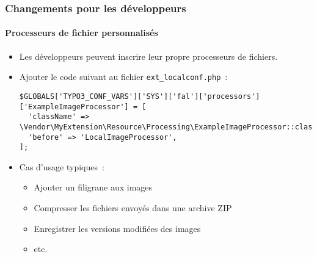 \begin{frame}[fragile]
	\frametitle{Changements pour les développeurs}
	\framesubtitle{Processeurs de fichier personnalisés}

	\lstset{basicstyle=\tiny\ttfamily}

	\begin{itemize}
		\item Les développeurs peuvent inscrire leur propre processeurs de fichiers.
		\item Ajouter le code suivant au fichier \texttt{ext\_localconf.php}~:

\begin{lstlisting}
$GLOBALS['TYPO3_CONF_VARS']['SYS']['fal']['processors']['ExampleImageProcessor'] = [
  'className' => \Vendor\MyExtension\Resource\Processing\ExampleImageProcessor::class,
  'before' => 'LocalImageProcessor',
];
\end{lstlisting}

		\item Cas d'usage typiques~:

			\begin{itemize}
				\item Ajouter un filigrane aux images
				\item Compresser les fichiers envoyés dans une archive ZIP
				\item Enregistrer les versions modifiées des images
				\item etc.
			\end{itemize}

	\end{itemize}

\end{frame}


